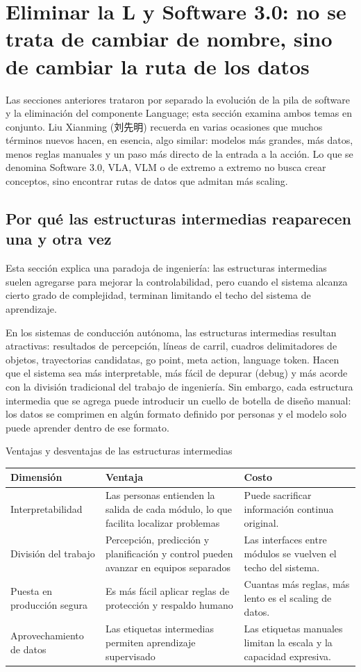 \section{Eliminar la L y Software 3.0: no se trata de cambiar de nombre, sino de cambiar la ruta de los datos}

Las secciones anteriores trataron por separado la evolución de la pila de software y la eliminación del componente Language; esta sección examina ambos temas en conjunto. Liu Xianming (刘先明) recuerda en varias ocasiones que muchos términos nuevos hacen, en esencia, algo similar: modelos más grandes, más datos, menos reglas manuales y un paso más directo de la entrada a la acción. Lo que se denomina Software 3.0, VLA, VLM o de extremo a extremo no busca crear conceptos, sino encontrar rutas de datos que admitan más scaling.

\subsection{Por qué las estructuras intermedias reaparecen una y otra vez}

Esta sección explica una paradoja de ingeniería: las estructuras intermedias suelen agregarse para mejorar la controlabilidad, pero cuando el sistema alcanza cierto grado de complejidad, terminan limitando el techo del sistema de aprendizaje.

En los sistemas de conducción autónoma, las estructuras intermedias resultan atractivas: resultados de percepción, líneas de carril, cuadros delimitadores de objetos, trayectorias candidatas, go point, meta action, language token. Hacen que el sistema sea más interpretable, más fácil de depurar (debug) y más acorde con la división tradicional del trabajo de ingeniería. Sin embargo, cada estructura intermedia que se agrega puede introducir un cuello de botella de diseño manual: los datos se comprimen en algún formato definido por personas y el modelo solo puede aprender dentro de ese formato.

\begin{knowledgebox}{Ventajas y desventajas de las estructuras intermedias}
\begin{tabularx}{\textwidth}{p{}p{}X}
\toprule
Dimensión & Ventaja & Costo \\
\midrule
Interpretabilidad & Las personas entienden la salida de cada módulo, lo que facilita localizar problemas & Puede sacrificar información continua original. \\
División del trabajo & Percepción, predicción y planificación y control pueden avanzar en equipos separados & Las interfaces entre módulos se vuelven el techo del sistema. \\
Puesta en producción segura & Es más fácil aplicar reglas de protección y respaldo humano & Cuantas más reglas, más lento es el scaling de datos. \\
Aprovechamiento de datos & Las etiquetas intermedias permiten aprendizaje supervisado & Las etiquetas manuales limitan la escala y la capacidad expresiva. \\
\bottomrule
\end{tabularx}
\end{knowledgebox}

